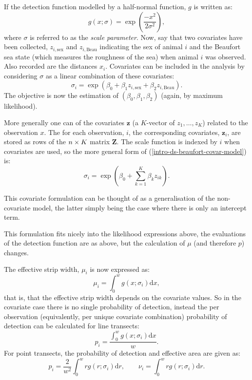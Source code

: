 If the detection function modelled by a half-normal function, $g$ is written as:
\begin{equation*}
g(x; \sigma) = \exp\left (\frac{-x^2}{2\sigma^2}\right ),
\end{equation*}
where $\sigma$ is referred to as the \textit{scale parameter}. Now, say that two covariates have been collected, $z_{i,\text{sex}}$ and $z_{i,\text{Beau}}$ indicating the sex of animal $i$ and the Beaufort sea state (which measures the roughness of the sea) when animal $i$ was observed. Also recorded are the distances $x_i$. Covariates can be included in the analysis by considering $\sigma$ as a linear combination of these covariates:
\begin{equation}
\sigma_i = \exp( \beta_0 + \beta_1 z_{i,\text{sex}} + \beta_2 z_{i,\text{Beau}}).
\label{intro-ds-beaufort-covar-model}
\end{equation}
The objective is now the estimation of $(\beta_0, \beta_1, \beta_2)$ (again, by maximum likelihood).

More generally one can of the covariates $\mathbf{z}$ (a $K$-vector of $z_1, \dots, z_K$) related to the observation $x$. The for each observation, $i$, the corresponding covariates, $\mathbf{z}_i$, are stored as rows of the $n \times K$ matrix $\mathbf{Z}$. The scale function is indexed by $i$ when covariates are used, so the more general form of (\ref{intro-ds-beaufort-covar-model}) is:
\begin{equation}
\sigma_{i} = \exp( \beta_{0} + \sum_{k=1}^K \beta_k z_{ik}).
\label{intro-ds-covar-model}
\end{equation}

This covariate formulation can be thought of as a generalisation of the non-covariate model, the latter simply being the case where there is only an intercept term. 

This formulation fits nicely into the likelihood expressions above, the evaluations of the detection function are as above, but the calculation of $\mu$ (and therefore $p$) changes. 

The effective strip width, $\mu_i$ is now expressed as:
\begin{equation}
\mu_i = \int_0^w g(x ; \sigma_i) \text{d}x,
\label{intro-ds-mu-covar}
\end{equation}
that is, that the effective strip width depends on the covariate values. So in the covariate case there is no single probability of detection, instead the per observation (equivalently, per unique covariate combination) probability of detection can be calculated for line transects:
\begin{equation*}
p_i = \frac{\int_0^w g(x ; \sigma_{i}) \text{d}x}{w}.
\end{equation*}
For point transects, the probability of detection and effective area are given as:
\begin{equation*}
p_i =\frac{2}{w^2}\int_0^w r g(r; \sigma_i) \text{d}r, \qquad \nu_i = \int_0^w r g(r; \sigma_i) \text{d}r.
\end{equation*}

